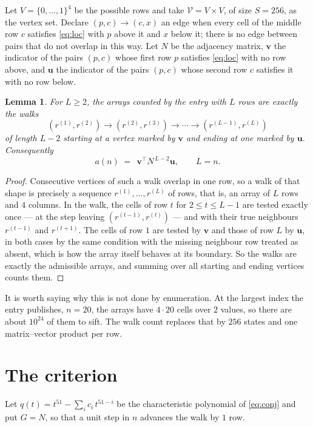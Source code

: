 \documentclass[11pt,a4paper]{article}
\theoremstyle{plain}
\newtheorem{lemma}[theorem]{Lemma}
\theoremstyle{definition}
\begin{document}
Let $V=\{0,\dots,1\}^{4}$ be the possible rows and take
$\mathcal V=V\times V$, of size $S=256$, as the vertex set. Declare $(p,c)\to(c,x)$ an edge
when every cell of the middle row $c$ satisfies \eqref{eq:loc} with $p$ above it and $x$
below it; there is no edge between pairs that do not overlap in this way. Let $N$ be the
adjacency matrix, $\mathbf{v}$ the indicator of the pairs $(p,c)$ whose first row $p$
satisfies \eqref{eq:loc} with no row above, and $\mathbf{u}$ the indicator of
the pairs $(p,c)$ whose second row $c$ satisfies it with no row below.

\begin{lemma}\label{lem:walk}
For $L\ge2$, the arrays counted by the entry with $L$ rows are exactly the walks
\[
(r^{(1)},r^{(2)})\to(r^{(2)},r^{(3)})\to\cdots\to(r^{(L-1)},r^{(L)})
\]
of length $L-2$ starting at a vertex marked by $\mathbf{v}$ and ending at one marked by
$\mathbf{u}$. Consequently
\[
a(n)\;=\;\,\mathbf{v}^{\!\top}N^{\,L-2}\mathbf{u},\qquad L=n .
\]
\end{lemma}

\begin{proof}
Consecutive vertices of such a walk overlap in one row, so a walk of that shape is
precisely a sequence $r^{(1)},\dots,r^{(L)}$ of rows, that is, an array of $L$ rows
and $4$ columns. In the walk, the cells of row $t$ for $2\le t\le L-1$ are tested
exactly once --- at the step leaving $(r^{(t-1)},r^{(t)})$ --- and with their true
neighbours $r^{(t-1)}$ and $r^{(t+1)}$. The cells of row $1$ are tested by
$\mathbf{v}$ and those of row $L$ by $\mathbf{u}$, in both cases by the same condition
with the missing neighbour row treated as absent, which is how the array itself behaves at
its boundary. So the walks are exactly the admissible arrays, and summing over all starting
and ending vertices counts them.
\end{proof}


It is worth saying why this is not done by enumeration. At the largest index the entry
publishes, $n=20$, the arrays have $4\cdot20$ cells over
$2$ values, so there are about $10^{24}$ of them to sift. The
walk count replaces that by $256$ states and one matrix--vector product per row.
\section{The criterion}

Let $q(t)=t^{51}-\sum_i c_i\,t^{51-i}$ be the characteristic polynomial of
\eqref{eq:conj} and put $G=N$, so that a unit step in $n$ advances the walk by
$1$ row.
\end{document}

